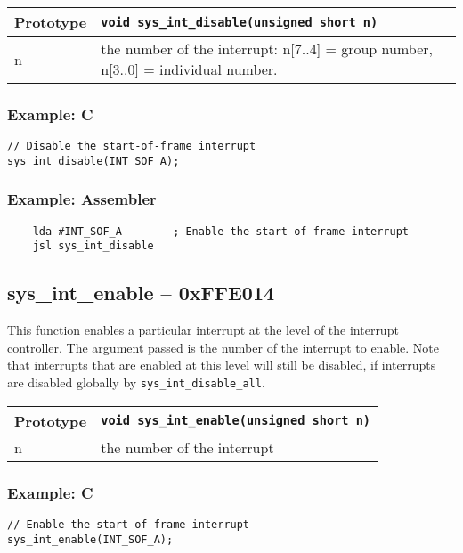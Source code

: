 \bigskip

\begin{tabular}{|l||l|} \hline
Prototype & \lstinline!void sys_int_disable(unsigned short n)! \\ \hline
n & the number of the interrupt: n[7..4] = group number, n[3..0] = individual number. \\ \hline
\end{tabular}

\subsubsection*{Example: C}
\begin{lstlisting}
// Disable the start-of-frame interrupt
sys_int_disable(INT_SOF_A);
\end{lstlisting}

\subsubsection*{Example: Assembler}
\begin{verbatim}
    lda #INT_SOF_A        ; Enable the start-of-frame interrupt
    jsl sys_int_disable
\end{verbatim}

\subsection*{sys\_int\_enable -- 0xFFE014}
This function enables a particular interrupt at the level of the interrupt controller. The argument passed is the number of the interrupt to enable. Note that interrupts that are enabled at this level will still be disabled, if interrupts are disabled globally by \verb+sys_int_disable_all+.

\bigskip

\begin{tabular}{|l||l|} \hline
Prototype & \lstinline!void sys_int_enable(unsigned short n)! \\ \hline
n & the number of the interrupt \\ \hline
\end{tabular}

\subsubsection*{Example: C}
\begin{lstlisting}
// Enable the start-of-frame interrupt
sys_int_enable(INT_SOF_A);
\end{lstlisting}

